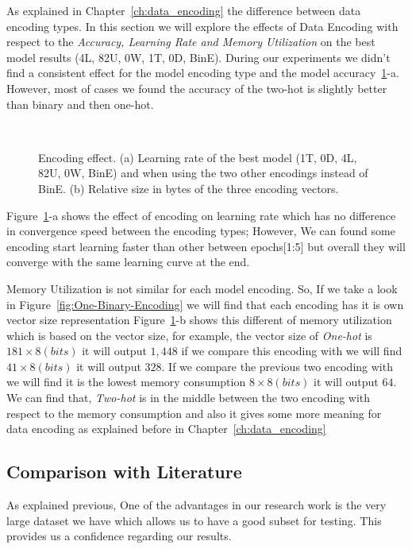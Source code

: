 As explained in Chapter~\ref{ch:data_encoding} the difference between data encoding types. In this section we will explore the effects of Data Encoding with respect to the \textit{Accuracy, Learning Rate and Memory Utilization} on the best model results (4L, 82U, 0W, 1T, 0D, BinE). During our experiments we didn't find a consistent effect for the model encoding type and the model accuracy~\ref{fig:Convergence_Memory}-a. However, most of cases we found the accuracy of the two-hot is slightly better than binary and then one-hot.


\begin{figure}[!h]
  \centering
  \begin{tikzpicture}[scale=1.2]
    
        
  \end{tikzpicture}
  \caption{Encoding effect. (a) Learning rate of the best model (1T, 0D, 4L, 82U, 0W, BinE) and when using the two other encodings instead of BinE. (b) Relative size in bytes of the three encoding vectors.}~\label{fig:Convergence_Memory}
\end{figure}


Figure~\ref{fig:Convergence_Memory}-a shows the effect of encoding on learning rate which has no difference in convergence speed between the encoding types; However, We can found some encoding start learning faster than other between epochs[1:5] but overall they will converge with the same learning curve at the end.


Memory Utilization is not similar for each model encoding. So, If we take a look in Figure~\ref{fig:One-Binary-Encoding} we will find that each encoding has it is own vector size representation Figure~\ref{fig:Convergence_Memory}-b shows this different of memory utilization which is based on the vector size, for example, the vector size of \textit{One-hot} is $181 \times 8(bits)$ it will output $1,448$ if we compare this encoding with  we will find $41 \times 8(bits)$ it will output $328$. If we compare the previous two encoding with  we will find it is the lowest memory consumption $8 \times 8(bits)$ it will output $64$. We can find that, \textit{Two-hot} is in the middle between the two encoding with respect to the memory consumption and also it gives some more meaning for data encoding as explained before in Chapter~\ref{ch:data_encoding}
\newpage
\subsection{Comparison with Literature}
As explained previous, One of the advantages in our research work is the very large dataset we have which allows us to have a good subset for testing. This provides us a confidence regarding our results.


